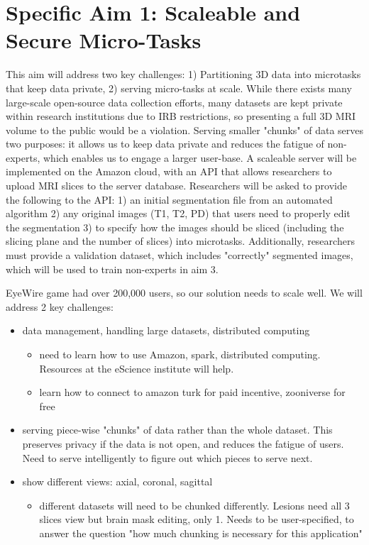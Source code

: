 \section{Specific Aim 1: Scaleable and Secure Micro-Tasks}

This aim will address two key challenges: 1) Partitioning 3D data into microtasks that keep data private, 2) serving micro-tasks at scale. While there exists many large-scale open-source data collection efforts, many datasets are kept private within research institutions due to  IRB restrictions, so presenting a full 3D MRI volume to the public would be a violation. Serving smaller "chunks" of data serves two purposes: it allows us to keep data private and reduces the fatigue of non-experts, which enables us to engage a larger user-base. A scaleable server will be implemented on the Amazon cloud, with an API that allows researchers to upload MRI slices to the server database. Researchers will be asked to provide the following to the API: 1) an initial segmentation file from an automated algorithm 2) any original images (T1, T2, PD) that  users need to properly edit the segmentation 3) to specify how the images should be sliced (including the slicing plane and the number of slices) into microtasks. Additionally, researchers must provide a validation dataset, which includes "correctly" segmented images, which will be used to train non-experts in aim 3.

EyeWire game had over 200,000 users, so our solution needs to scale well. 
We will address 2 key challenges:
\begin{itemize}
\item data management, handling large datasets, distributed computing 
\begin{itemize}
\item need to learn how to use Amazon, spark, distributed computing. Resources at the eScience institute will help. 
\item learn how to connect to amazon turk for paid incentive, zooniverse for free
\end{itemize}
\item serving piece-wise "chunks" of data rather than the whole dataset. This preserves privacy if the data is not open, and reduces the fatigue of users. Need to serve intelligently to figure out which pieces to serve next.
\item show different views: axial, coronal, sagittal
\begin{itemize}
\item different datasets will need to be chunked differently. Lesions need all 3 slices view but brain mask editing, only 1. Needs to be user-specified, to answer the question "how much chunking is necessary for this application"
\end{itemize}
\end{itemize}